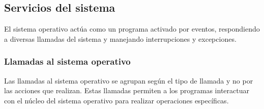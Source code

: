 \subsection{Servicios del sistema}

El sistema operativo actúa como un programa activado por eventos, respondiendo a diversas llamadas del sistema y manejando interrupciones y excepciones.
\subsubsection{Llamadas al sistema operativo}
	
Las llamadas al sistema operativo se agrupan según el tipo de llamada y  no por las acciones que realizan. Estas llamadas permiten a los programas interactuar con el núcleo del sistema operativo para realizar operaciones específicas.

